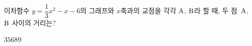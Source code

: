이차함수 $y=\dfrac{1}{3}x^2-x-6$의 그래프와 $x$축과의 교점을 각각 $\mathrm{A}$, $\mathrm{B}$라 할 때, 두 점~$\mathrm{A}$, $\mathrm{B}$ 사이의 거리는?
\begin{choices32}{$3$}{$5$}{$6$}{$8$}{$9$}\end{choices32}
